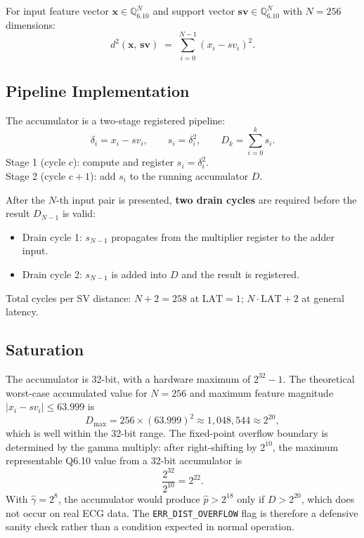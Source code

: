\documentclass[11pt]{article}
\begin{document}
For input feature vector \(\mathbf{x} \in \mathbb{Q}_{6.10}^{N}\) and support
vector \(\mathbf{sv} \in \mathbb{Q}_{6.10}^{N}\) with \(N = 256\) dimensions:
\[
    d^2(\mathbf{x},\, \mathbf{sv})
    \;=\;
    \sum_{i=0}^{N-1} \left( x_i - sv_i \right)^2.
\]

\subsection{Pipeline Implementation}

The accumulator is a two-stage registered pipeline:
\[
    \delta_i = x_i - sv_i,
    \qquad
    s_i = \delta_i^2,
    \qquad
    D_k = \sum_{i=0}^{k} s_i.
\]
Stage 1 (cycle \(c\)): compute and register \(s_i = \delta_i^2\).\\
Stage 2 (cycle \(c+1\)): add \(s_i\) to the running accumulator \(D\).

After the \(N\)-th input pair is presented, \textbf{two drain cycles} are
required before the result \(D_{N-1}\) is valid:
\begin{itemize}
    \item Drain cycle 1: \(s_{N-1}\) propagates from the multiplier register to
          the adder input.
    \item Drain cycle 2: \(s_{N-1}\) is added into \(D\) and the result is
          registered.
\end{itemize}
Total cycles per SV distance: \(N + 2 = 258\) at \(\text{LAT}=1\);
\quad \(N \cdot \text{LAT} + 2\) at general latency.

\subsection{Saturation}

The accumulator is 32-bit, with a hardware maximum of \(2^{32} - 1\).
The theoretical worst-case accumulated value for \(N=256\) and maximum
feature magnitude \(|x_i - sv_i| \leq 63.999\) is
\[
    D_{\max} = 256 \times (63.999)^2 \approx 1{,}048{,}544 \approx 2^{20},
\]
which is well within the 32-bit range. The fixed-point overflow boundary
is determined by the gamma multiply: after right-shifting by \(2^{10}\),
the maximum representable Q6.10 value from a 32-bit accumulator is
\[
    \frac{2^{32}}{2^{10}} = 2^{22}.
\]
With \(\hat{\gamma} = 2^8\), the accumulator would produce
\(\hat{p} > 2^{18}\) only if \(D > 2^{20}\), which does not occur on
real ECG data. The \texttt{ERR\_DIST\_OVERFLOW} flag is therefore a
defensive sanity check rather than a condition expected in normal
operation.
\end{document}
